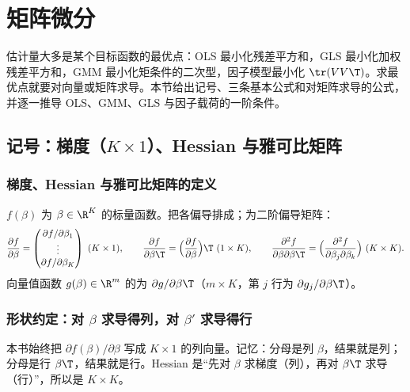 \section{矩阵微分}\label{sec:U01a-diff}

估计量大多是某个目标函数的最优点：OLS 最小化残差平方和，GLS 最小化加权残差平方和，GMM 最小化矩条件的二次型，因子模型最小化 $\tr(VV\T)$。求最优点就要对向量或矩阵求导。本节给出记号、三条基本公式和对矩阵求导的公式，并逐一推导 OLS、GMM、GLS 与因子载荷的一阶条件。

\subsection{记号：梯度（\texorpdfstring{$K\times1$}{K x 1}）、Hessian 与雅可比矩阵}

\subsubsection{梯度、Hessian 与雅可比矩阵的定义}

\begin{defn}\label{def:U01a-grad}
$f(\beta)$ 为 $\beta\in\R^K$ 的标量函数。把各偏导排成；为二阶偏导矩阵：
\[
\frac{\partial f}{\partial\beta}=\begin{pmatrix}\partial f/\partial\beta_1\\\vdots\\\partial f/\partial\beta_K\end{pmatrix}\ (K\times1),\qquad
\frac{\partial f}{\partial\beta\T}=\Big(\frac{\partial f}{\partial\beta}\Big)\T\ (1\times K),\qquad
\frac{\partial^2f}{\partial\beta\partial\beta\T}=\Big(\frac{\partial^2f}{\partial\beta_j\partial\beta_k}\Big)\ (K\times K).
\]
向量值函数 $g(\beta)\in\R^m$ 的为 $\partial g/\partial\beta\T$（$m\times K$，第 $j$ 行为 $\partial g_j/\partial\beta\T$）。
\end{defn}

\subsubsection{形状约定：对 \texorpdfstring{$\beta$}{beta} 求导得列，对 \texorpdfstring{$\beta'$}{beta'} 求导得行}

本书始终把 $\partial f(\beta)/\partial\beta$ 写成 $K\times1$ 的列向量。记忆：分母是列 $\beta$，结果就是列；分母是行 $\beta\T$，结果就是行。Hessian 是“先对 $\beta$ 求梯度（列），再对 $\beta\T$ 求导（行）”，所以是 $K\times K$。


